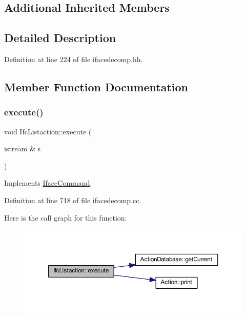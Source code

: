 \subsection*{Additional Inherited Members}


\subsection{Detailed Description}


Definition at line 224 of file ifacedecomp.\+hh.



\subsection{Member Function Documentation}
\mbox{\label{class_ifc_listaction_a4513740c2b18e325cbf9c5382a715d08}} 
\subsubsection{\texorpdfstring{execute()}{execute()}}
{\footnotesize\ttfamily void Ifc\+Listaction\+::execute (\begin{DoxyParamCaption}\item[{istream \&}]{s }\end{DoxyParamCaption})\hspace{0.3cm}{\ttfamily [virtual]}}



Implements \mbox{\hyperlink{class_iface_command_af10e29cee2c8e419de6efe9e680ad201}{Iface\+Command}}.



Definition at line 718 of file ifacedecomp.\+cc.

Here is the call graph for this function\+:
\nopagebreak
\begin{figure}[H]
\begin{center}
\leavevmode
\includegraphics[width=350pt]{class_ifc_listaction_a4513740c2b18e325cbf9c5382a715d08_cgraph}
\end{center}
\end{figure}


